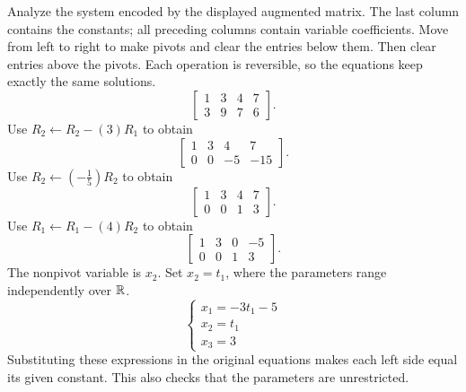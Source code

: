 \goal Analyze the system encoded by the displayed augmented matrix. The last column contains the constants; all preceding columns contain variable coefficients.
\idea Move from left to right to make pivots and clear the entries below them. Then clear entries above the pivots. Each operation is reversible, so the equations keep exactly the same solutions.
\[ \left[\begin{array}{rrr|r}1&3&4&7\\3&9&7&6\end{array}\right].\]
Use $R_{2}\leftarrow R_{2}-(3)R_{1}$ to obtain
\[ \left[\begin{array}{rrr|r}1&3&4&7\\0&0&-5&-15\end{array}\right].\]
Use $R_{2}\leftarrow(- \frac{1}{5})R_{2}$ to obtain
\[ \left[\begin{array}{rrr|r}1&3&4&7\\0&0&1&3\end{array}\right].\]
Use $R_{1}\leftarrow R_{1}-(4)R_{2}$ to obtain
\[ \left[\begin{array}{rrr|r}1&3&0&-5\\0&0&1&3\end{array}\right].\]
The nonpivot variable is $x_{2}$. Set $x_{2}=t_{1}$, where the parameters range independently over $\mathbb{R}$.
\[ \begin{cases}x_{1}=- 3 t_{1} - 5\\x_{2}=t_{1}\\x_{3}=3\end{cases}\]
Substituting these expressions in the original equations makes each left side equal its given constant. This also checks that the parameters are unrestricted.

